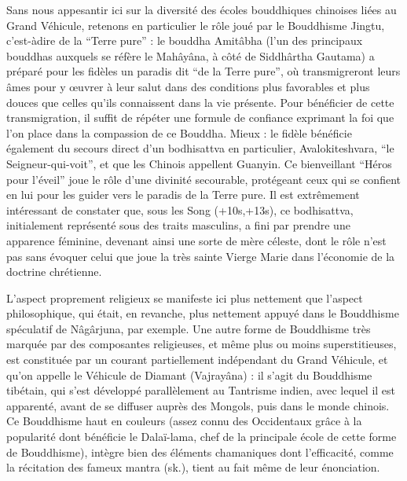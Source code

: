 Sans nous appesantir ici sur la diversité des écoles bouddhiques chinoises liées au
Grand Véhicule, retenons en particulier le rôle joué par le Bouddhisme Jingtu, c'est-àdire de la ``Terre pure'' : le bouddha Amitâbha (l'un des principaux bouddhas auxquels
se réfère le Mahâyâna, à côté de Siddhârtha Gautama) a préparé pour les fidèles un paradis dit ``de la Terre pure'', où transmigreront leurs âmes pour y œuvrer à leur salut
dans des conditions plus favorables et plus douces que celles qu'ils connaissent dans la
vie présente.
Pour bénéficier de cette transmigration, il suffit de répéter une formule de
confiance exprimant la foi que l'on place dans la compassion de ce Bouddha.
Mieux : le
fidèle bénéficie également du secours direct d'un bodhisattva en particulier, Avalokiteshvara, ``le Seigneur-qui-voit'', et que les Chinois appellent Guanyin.
Ce bienveillant
``Héros pour l'éveil'' joue le rôle d'une divinité secourable, protégeant ceux qui se
confient en lui pour les guider vers le paradis de la Terre pure.
Il est extrêmement intéressant de constater que, sous les Song (+10s,+13s), ce bodhisattva, initialement
représenté sous des traits masculins, a fini par prendre une apparence féminine, devenant ainsi une sorte de mère céleste, dont le rôle n'est pas sans évoquer celui que joue la
très sainte Vierge Marie dans l'économie de la doctrine chrétienne.

L'aspect proprement religieux se manifeste ici plus nettement que l'aspect philosophique, qui était, en revanche, plus nettement appuyé dans le Bouddhisme spéculatif de
Nâgârjuna, par exemple.
Une autre forme de Bouddhisme très marquée par des composantes religieuses, et même plus ou moins superstitieuses, est constituée par un courant
partiellement indépendant du Grand Véhicule, et qu'on appelle le Véhicule de Diamant
(Vajrayâna) : il s'agit du Bouddhisme tibétain, qui s'est développé parallèlement au
Tantrisme indien, avec lequel il est apparenté, avant de se diffuser auprès des Mongols,
puis dans le monde chinois.
Ce Bouddhisme haut en couleurs (assez connu des Occidentaux grâce à la popularité dont bénéficie le Dalaï-lama, chef de la principale école de
cette forme de Bouddhisme), intègre bien des éléments chamaniques dont l'efficacité,
comme la récitation des fameux mantra (sk.), tient au fait même de leur énonciation.

